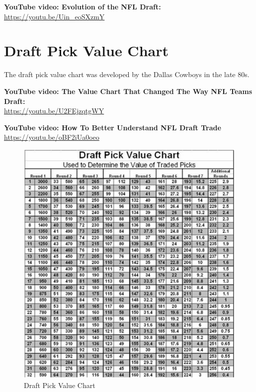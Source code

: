 \documentclass[
  11pt,
]{book}
\theoremstyle{definition}
\theoremstyle{definition}
\theoremstyle{definition}
\theoremstyle{definition}
\theoremstyle{remark}
\begin{document}
\textbf{YouTube video: Evolution of the NFL Draft:}\\
\url{https://youtu.be/Uin_eoSXzmY}

\newpage

\hypertarget{draft-pick-value-chart}{%
\section{Draft Pick Value Chart}\label{draft-pick-value-chart}}

The draft pick value chart was developed by the Dallas Cowboys in the late 80s.

\textbf{YouTube video: The Value Chart That Changed The Way NFL Teams Draft:}\\
\url{https://youtu.be/U2FEjzqtgWY}

\textbf{YouTube video: How To Better Understand NFL Draft Trade}\\
\url{https://youtu.be/oBF2iUa0oeo}

\begin{figure}
\centering
\includegraphics{images/draftvalue.jpeg}
\caption{Draft Pick Value Chart}
\end{figure}

\newpage
\end{document}

